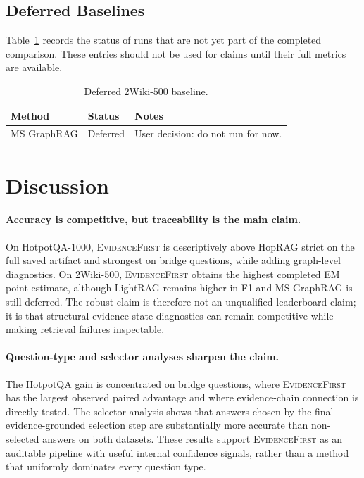 \documentclass[runningheads]{llncs}
\newcommand{\sys}{\textsc{EvidenceFirst}\xspace}
\begin{document}
\subsection{Deferred Baselines}

Table~\ref{tab:deferred} records the status of runs that are not yet part of
the completed comparison. These entries should not be used for claims until
their full metrics are available.

\begin{table}[t]
\centering
\caption{Deferred 2Wiki-500 baseline.}
\label{tab:deferred}
\small
\begin{tabular}{lll}
\toprule
Method & Status & Notes \\
\midrule
MS GraphRAG & Deferred & User decision: do not run for now. \\
\bottomrule
\end{tabular}
\end{table}

\section{Discussion}
\label{sec:discussion}

\paragraph{Accuracy is competitive, but traceability is the main claim.}
On HotpotQA-1000, \sys is descriptively above HopRAG strict on the full saved
artifact and strongest on bridge questions, while adding graph-level diagnostics.
On 2Wiki-500, \sys obtains the highest completed EM point estimate, although
LightRAG remains higher in F1 and MS GraphRAG is still deferred. The robust
claim is therefore not an unqualified leaderboard claim; it is that structural
evidence-state diagnostics can remain competitive while making retrieval
failures inspectable.

\paragraph{Question-type and selector analyses sharpen the claim.}
The HotpotQA gain is concentrated on bridge questions, where \sys has the
largest observed paired advantage and where evidence-chain connection is
directly tested. The selector analysis shows that answers chosen by the final
evidence-grounded selection step are substantially more accurate than
non-selected answers on both datasets. These results support \sys as an
auditable pipeline with useful internal confidence signals, rather than a
method that uniformly dominates every question type.
\end{document}
